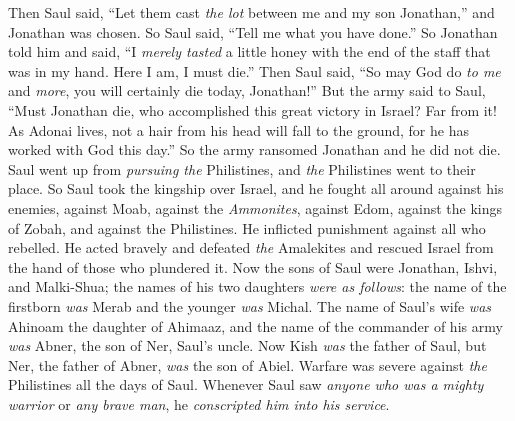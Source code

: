 \begin{biblechapter}
\verse Then Saul said, “Let them cast \textit{the lot} between me and my son Jonathan,” and Jonathan was chosen.
\verse So Saul said, “Tell me what you have done.” So Jonathan told him and said, “I \textit{merely tasted} a little honey with the end of the staff that was in my hand. Here I am, I must die.”
\verse Then Saul said, “So may God do \textit{to me} and \textit{more}, you will certainly die today, Jonathan!”
\verse But the army said to Saul, “Must Jonathan die, who accomplished this great victory in Israel? Far from it! As Adonai lives, not a hair from his head will fall to the ground, for he has worked with God this day.” So the army ransomed Jonathan and he did not die.
\verse Saul went up from \textit{pursuing the} Philistines, and \textit{the} Philistines went to their place.
\verse So Saul took the kingship over Israel, and he fought all around against his enemies, against Moab, against the \textit{Ammonites}, against Edom, against the kings of Zobah, and against the Philistines. He inflicted punishment against all who rebelled.
\verse He acted bravely and defeated \textit{the} Amalekites and rescued Israel from the hand of those who plundered it.
\verse Now the sons of Saul were Jonathan, Ishvi, and Malki-Shua; the names of his two daughters \textit{were as follows}: the name of the firstborn \textit{was} Merab and the younger \textit{was} Michal.
\verse The name of Saul’s wife \textit{was} Ahinoam the daughter of Ahimaaz, and the name of the commander of his army \textit{was} Abner, the son of Ner, Saul’s uncle.
\verse Now Kish \textit{was} the father of Saul, but Ner, the father of Abner, \textit{was} the son of Abiel.
\verse Warfare was severe against \textit{the} Philistines all the days of Saul. Whenever Saul saw \textit{anyone who was a mighty warrior} or \textit{any brave man}, he \textit{conscripted him into his service}.
\end{biblechapter}

